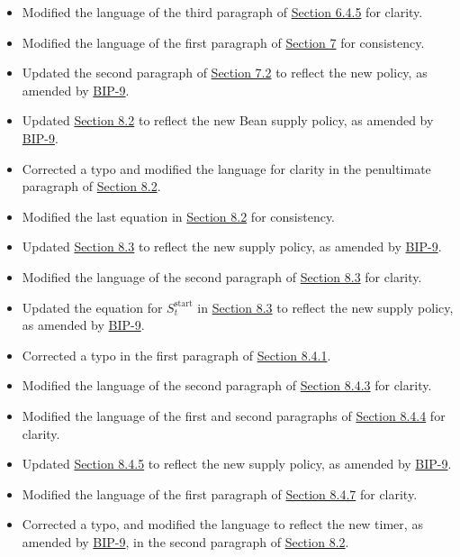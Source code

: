\documentclass[class=article, crop=false]{standalone}
\begin{document}
\begin{itemize}[topsep=0pt, itemsep=3pt,leftmargin=16pt]
\begin{itemize}
        \item Modified the language of the third paragraph of \hyperlink{subsubsection.6.4.5}{Section 6.4.5} for clarity.
        \item Modified the language of the first paragraph of \hyperlink{section.7}{Section 7} for consistency.
        \item Updated the second paragraph of \hyperlink{subsection.7.2}{Section 7.2} to reflect the new  policy, as amended by \href{https://bean.money/bip-9}{BIP-9}.
        \item Updated \hyperlink{subsection.8.2}{Section 8.2} to reflect the new Bean supply policy, as amended by \href{https://bean.money/bip-9}{BIP-9}.
        \item Corrected a typo and modified the language for clarity in the penultimate paragraph of \hyperlink{subsection.8.2}{Section 8.2}.
        \item Modified the last equation in \hyperlink{subsection.8.2}{Section 8.2} for consistency.
        \item Updated \hyperlink{subsection.8.3}{Section 8.3} to reflect the new  supply policy, as amended by \href{https://bean.money/bip-9}{BIP-9}.
        \item Modified the language of the second paragraph of \hyperlink{subsection.8.3}{Section 8.3} for clarity.
        \item Updated the equation for $S_t^{\text{start}}$ in \hyperlink{subsection.8.3}{Section 8.3} to reflect the new  supply policy, as amended by \href{https://bean.money/bip-9}{BIP-9}.
        \item Corrected a typo in the first paragraph of \hyperlink{subsubsection.8.4.1}{Section 8.4.1}.
        \item Modified the language of the second paragraph of \hyperlink{subsubsection.8.4.3}{Section 8.4.3} for clarity.
        \item Modified the language of the first and second paragraphs of \hyperlink{subsubsection.8.4.4}{Section 8.4.4} for clarity.
        \item Updated \hyperlink{subsubsection.8.4.5}{Section 8.4.5} to reflect the new  supply policy, as amended by \href{https://bean.money/bip-9}{BIP-9}.
        \item Modified the language of the first paragraph of \hyperlink{subsubsection.8.4.7}{Section 8.4.7} for clarity.
        \item Corrected a typo, and modified the language to reflect the new  timer, as amended by \href{https://bean.money/bip-9}{BIP-9}, in the second paragraph of \hyperlink{subsection.8.2}{Section 8.2}.

\end{itemize}
\end{itemize}
\end{document}
